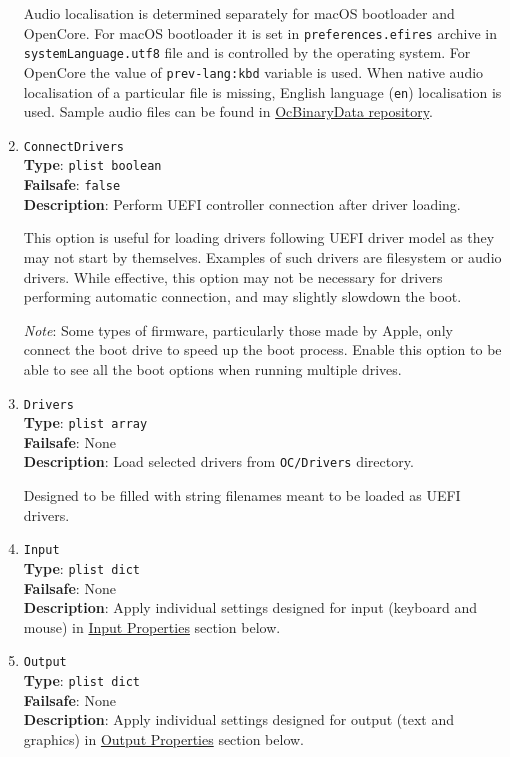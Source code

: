 \documentclass[]{article}
\begin{document}
\begin{enumerate}
  Audio localisation is determined separately for macOS bootloader and OpenCore.
  For macOS bootloader it is set in \texttt{preferences.efires} archive in
  \texttt{systemLanguage.utf8} file and is controlled by the operating system.
  For OpenCore the value of \texttt{prev-lang:kbd} variable is used.
  When native audio localisation of a particular file is missing, English language
  (\texttt{en}) localisation is used. Sample audio files can be found in
  \href{https://github.com/acidanthera/OcBinaryData}{OcBinaryData repository}.

\item
  \texttt{ConnectDrivers}\\
  \textbf{Type}: \texttt{plist\ boolean}\\
  \textbf{Failsafe}: \texttt{false}\\
  \textbf{Description}: Perform UEFI controller connection after driver loading.

  This option is useful for loading drivers following UEFI driver model
  as they may not start by themselves. Examples of such drivers are filesystem
  or audio drivers. While effective, this option may not be necessary for drivers
  performing automatic connection, and may slightly slowdown the boot.

  \emph{Note}: Some types of firmware, particularly those made by Apple, only connect the boot
  drive to speed up the boot process. Enable this option to be able to see all the
  boot options when running multiple drives.

\item
  \texttt{Drivers}\\
  \textbf{Type}: \texttt{plist\ array}\\
  \textbf{Failsafe}: None\\
  \textbf{Description}: Load selected drivers from \texttt{OC/Drivers}
  directory.

  Designed to be filled with string filenames meant to be loaded as UEFI
  drivers.

\item
  \texttt{Input}\\
  \textbf{Type}: \texttt{plist\ dict}\\
  \textbf{Failsafe}: None\\
  \textbf{Description}: Apply individual settings designed for input (keyboard and mouse) in
  \hyperref[uefiinputprops]{Input Properties} section below.

\item
  \texttt{Output}\\
  \textbf{Type}: \texttt{plist\ dict}\\
  \textbf{Failsafe}: None\\
  \textbf{Description}: Apply individual settings designed for output (text and graphics) in
  \hyperref[uefioutputprops]{Output Properties} section below.


\end{enumerate}
\end{document}
